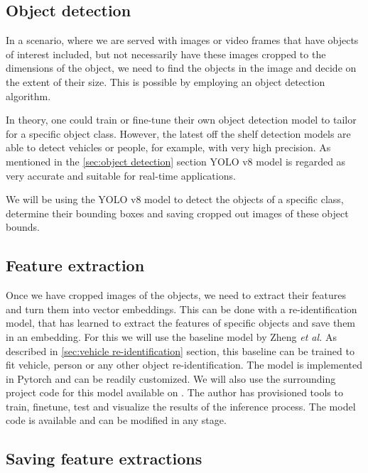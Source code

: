 \documentclass[conference]{IEEEtran} %
\begin{document}
	\subsection{Object detection}
	
		In a scenario, where we are served with images or video frames that have objects of interest included, but not necessarily have these images cropped to the dimensions of the object, we need to find the objects in the image and decide on the extent of their size. This is possible by employing an object detection algorithm.
		 
		In theory, one could train or fine-tune their own object detection model to tailor for a specific object class. However, the latest off the shelf detection models are able to detect vehicles or people, for example, with very high precision. As mentioned in the \ref{sec:object detection} section YOLO v8 model is regarded as very accurate and suitable for real-time applications.
		 
		We will be using the YOLO v8 model to detect the objects of a specific class, determine their bounding boxes and saving cropped out images of these object bounds.
	
	\subsection{Feature extraction}
	
		Once we have cropped images of the objects, we need to extract their features and turn them into vector embeddings. This can be done with a re-identification model, that has learned to extract the features of specific objects and save them in an embedding. For this we will use the baseline model by Zheng \textit{et al.} As described in \ref{sec:vehicle re-identification} section, this baseline can be trained to fit vehicle, person or any other object re-identification. The model is implemented in Pytorch and can be readily customized. We will also use the surrounding project code for this model available on \cite{layumiGithub}. The author has provisioned tools to train, finetune, test and visualize the results of the inference process. The model code is available and can be modified in any stage.
		
	\subsection{Saving feature extractions}
	
		
\end{document}
